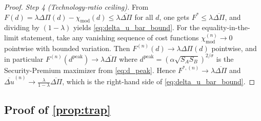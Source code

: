 \begin{proof}
\textit{Step 4 (Technology-ratio ceiling).}
From $F(d)=\lambda\Delta\Pi(d)-\chi_{\mathrm{mod}}(d)\le\lambda\overline{\Delta\Pi}$ for all $d$, one gets $F^*\le\lambda\overline{\Delta\Pi}$, and dividing by $(1-\lambda)$ yields \autoref{eq:delta_u_bar_bound}. For the equality-in-the-limit statement, take any vanishing sequence of cost functions $\chi_{\mathrm{mod}}^{(n)}\to 0$ pointwise with bounded variation. Then $F^{(n)}(d)\to\lambda\Delta\Pi(d)$ pointwise, and in particular $F^{(n)}(d^{\mathrm{peak}})\to\lambda\overline{\Delta\Pi}$ where $d^{\mathrm{peak}}=(\alpha\sqrt{S_A S_B})^{2/\sigma}$ is the Security-Premium maximizer from \autoref{eq:d_peak}. Hence $F^{*,(n)}\to\lambda\overline{\Delta\Pi}$ and $\overline{\Delta u}^{(n)}\to\frac{\lambda}{1-\lambda}\overline{\Delta\Pi}$, which is the right-hand side of \autoref{eq:delta_u_bar_bound}.
\end{proof}

\subsection*{Proof of \autoref{prop:trap}} \label{app:proof:trap}

